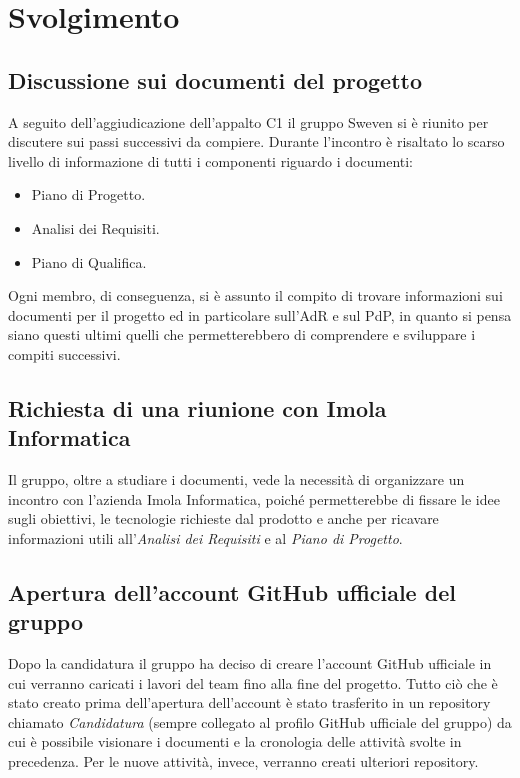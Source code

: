 \section{Svolgimento}
\subsection{Discussione sui documenti del progetto}
A seguito dell'aggiudicazione dell'appalto C1 il gruppo Sweven si è riunito per discutere sui passi successivi da compiere.
Durante l'incontro è risaltato lo scarso livello di informazione di tutti i componenti riguardo i documenti:
\begin{itemize}
    \item Piano di Progetto.
    \item Analisi dei Requisiti.
    \item Piano di Qualifica.
\end{itemize}
Ogni membro, di conseguenza, si è assunto il compito di trovare informazioni sui documenti per il progetto ed in particolare
sull'AdR e sul PdP, in quanto si pensa siano questi ultimi quelli che permetterebbero di comprendere e sviluppare i compiti successivi.

\subsection{Richiesta di una riunione con Imola Informatica}
Il gruppo, oltre a studiare i documenti, vede la necessità di organizzare un incontro con l'azienda Imola Informatica, poiché
permetterebbe di fissare le idee sugli obiettivi, le tecnologie richieste dal prodotto e anche per ricavare
informazioni utili all'\emph{Analisi dei Requisiti} e al \emph{Piano di Progetto}.

\subsection{Apertura dell'account GitHub ufficiale del gruppo}
Dopo la candidatura il gruppo ha deciso di creare l'account GitHub ufficiale in cui verranno caricati i lavori del team
fino alla fine del progetto. Tutto ciò che è stato creato prima dell'apertura dell'account è stato trasferito
in un repository chiamato \emph{Candidatura} (sempre collegato al profilo GitHub ufficiale del gruppo)
da cui è possibile visionare i documenti e la cronologia delle attività svolte in precedenza. 
Per le nuove attività, invece, verranno creati ulteriori repository.